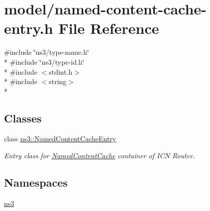 \hypertarget{named-content-cache-entry_8h}{\section{model/named-\/content-\/cache-\/entry.h File Reference}
\label{named-content-cache-entry_8h}
}
{\ttfamily \#include \char`\"{}ns3/type-\/name.\-h\char`\"{}}\\*
{\ttfamily \#include \char`\"{}ns3/type-\/id.\-h\char`\"{}}\\*
{\ttfamily \#include $<$stdint.\-h$>$}\\*
{\ttfamily \#include $<$string$>$}\\*
\subsection*{Classes}
\begin{DoxyCompactItemize}
\item 
class \hyperlink{classns3_1_1NamedContentCacheEntry}{ns3\-::\-Named\-Content\-Cache\-Entry}
\begin{DoxyCompactList}\small\item\em Entry class for \hyperlink{classns3_1_1NamedContentCache}{Named\-Content\-Cache} container of I\-C\-N Router. \end{DoxyCompactList}\end{DoxyCompactItemize}
\subsection*{Namespaces}
\begin{DoxyCompactItemize}
\item 
\hyperlink{namespacens3}{ns3}
\end{DoxyCompactItemize}
